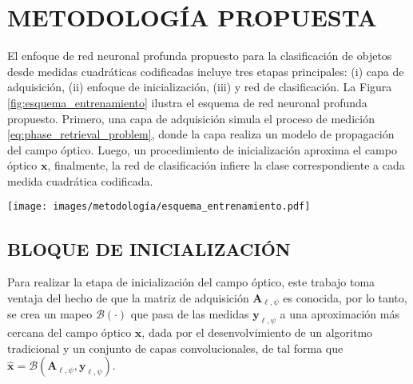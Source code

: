 
\chapter{METODOLOGÍA PROPUESTA}

El enfoque de red neuronal profunda propuesto para la clasificación de objetos desde medidas cuadráticas codificadas incluye tres etapas principales: (i) capa de adquisición, (ii) enfoque de inicialización, (iii) y red de clasificación. La Figura \ref{fig:esquema_entrenamiento} ilustra el esquema de red neuronal profunda propuesto. Primero, una capa de adquisición simula el proceso de medición \eqref{eq:phase_retrieval_problem}, donde la capa realiza un modelo de propagación del campo óptico. Luego, un procedimiento de inicialización aproxima el campo óptico $\mathbf{x}$, finalmente, la red de clasificación infiere la clase correspondiente a cada medida cuadrática codificada.


\begin{figure*}[!h]
    \centering
    \texttt{[image: images/metodología/esquema\_entrenamiento.pdf]}
    \caption{Esquema de red neuronal profunda de tres etapas propuesto para la clasificación de objetos desde medidas cuadráticas codificadas.}
    \label{fig:esquema_entrenamiento}
\end{figure*}


\section{BLOQUE DE INICIALIZACIÓN}

Para realizar la etapa de inicialización del campo óptico, este trabajo toma ventaja del hecho de que la matriz de adquisición $\mathbf{A}_{\ell, \psi}$ es conocida, por lo tanto, se crea un mapeo $\mathcal{B}(\cdot)$ que pasa de las medidas $\mathbf{y}_{\ell, \psi}$ a una aproximación más cercana del campo óptico $\mathbf{x}$, dada por el desenvolvimiento de un algoritmo tradicional y un conjunto de capas convolucionales, de tal forma que $\hat{\mathbf{x}}=\mathcal{B}(\mathbf{A}_{\ell, \psi}, \mathbf{y}_{\ell, \psi})$. 

